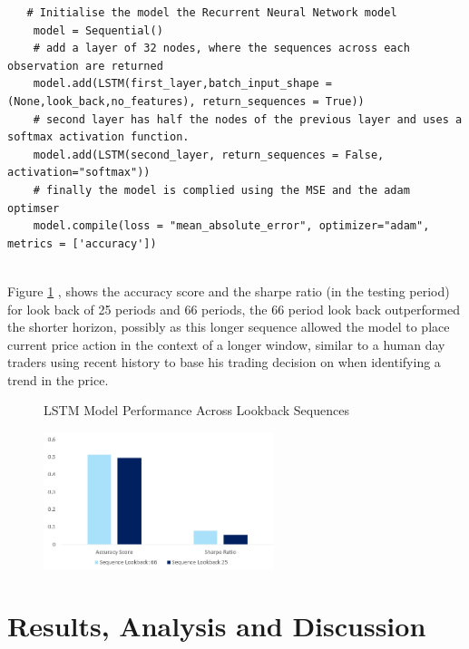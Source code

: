 \documentclass[11pt]{article}
\begin{document}
\begin{lstlisting}
   # Initialise the model the Recurrent Neural Network model
    model = Sequential()
    # add a layer of 32 nodes, where the sequences across each observation are returned 
    model.add(LSTM(first_layer,batch_input_shape = (None,look_back,no_features), return_sequences = True))
    # second layer has half the nodes of the previous layer and uses a softmax activation function.
    model.add(LSTM(second_layer, return_sequences = False, activation="softmax"))
    # finally the model is complied using the MSE and the adam optimser
    model.compile(loss = "mean_absolute_error", optimizer="adam", metrics = ['accuracy'])
    
\end{lstlisting}
Figure \ref{fig:LSTMlookbacks} , shows the accuracy score and the sharpe ratio (in the testing period) for look back of 25 periods and 66 periods, the 66 period look back outperformed the shorter horizon, possibly as this longer sequence allowed the model to place current price action in the context of a longer window, similar to a human day traders using recent history to base his trading decision on when identifying a trend in the price.
\begin{figure}[h]
    \centering
	\caption{LSTM Model Performance Across Lookback Sequences}    
	\includegraphics[width=0.6\textwidth]{LSTMlookbacks}
    \label{fig:LSTMlookbacks}
     \caption*{}
\end{figure}


\section{Results, Analysis and Discussion}  \label{results}
\end{document}
